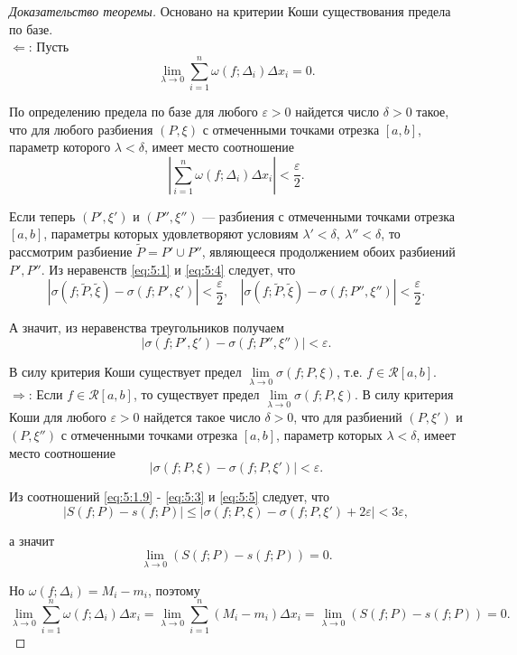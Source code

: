 \documentclass[12pt]{article}
\numberwithin{equation}{section}
\begin{document}
\begin{proof}[Доказательство теоремы] Основано на критерии Коши существования предела по базе.\\

$\Leftarrow$: Пусть
\[ \lim_{\lambda \to 0} \sum_{i=1}^n \omega(f; \Delta_i) \Delta x_i = 0.\]

По определению предела по базе для любого $\varepsilon > 0$ найдется число $\delta > 0$ такое, что для любого разбиения $(P, \xi)$ с отмеченными точками отрезка $[a,b]$, параметр которого $\lambda < \delta$, имеет место соотношение
\begin{equation}
\left| \sum_{i=1}^n \omega(f; \Delta_i) \Delta x_i\right| < \frac{\varepsilon}{2}. \label{eq:5:4}
\end{equation}

Если теперь $(P', \xi')$ и $(P'', \xi'')$  --- разбиения с отмеченными точками отрезка $[a,b]$, параметры которых удовлетворяют условиям $\lambda' < \delta,~ \lambda'' < \delta$, то рассмотрим разбиение $\tilde{P} = P' \cup P''$, являющееся продолжением обоих разбиений $P', P''$. Из неравенств \eqref{eq:5:1} и \eqref{eq:5:4} следует, что
\[ \left|\sigma(f; \tilde{P}, \tilde{\xi}) - \sigma(f; P', \xi') \right| < \frac{\varepsilon}{2}, ~~~~ \left|\sigma(f; \tilde{P}, \tilde{\xi}) - \sigma(f; P'', \xi'')\right| < \frac{\varepsilon}{2}. \]

А значит, из неравенства треугольников получаем
\[ \left| \sigma(f; P', \xi') - \sigma(f; P'', \xi'')\right| < \varepsilon.\]

В силу критерия Коши существует предел $\lim\limits_{\lambda \to 0} \sigma(f; P, \xi)$, т.е. $f \in \mathcal{R}[a,b]$.\\

$\Rightarrow$: Если  $f \in \mathcal{R}[a,b]$, то существует предел  $\lim\limits_{\lambda \to 0} \sigma(f; P, \xi)$. В силу критерия Коши для любого $\varepsilon > 0$ найдется такое число $\delta > 0$, что для разбиений $(P, \xi')$ и $(P, \xi'')$ с отмеченными точками отрезка $[a,b]$, параметр которых $\lambda < \delta$, имеет место соотношение
\begin{equation}
\left| \sigma(f;P, \xi) - \sigma(f;P, \xi')\right| < \varepsilon. \label{eq:5:5}
\end{equation}


Из соотношений \eqref{eq:5:1.9} - \eqref{eq:5:3} и \eqref{eq:5:5} следует, что
\[ \left| S(f;P) - s(f;P)\right| \leqslant | \sigma(f;P, \xi) - \sigma(f; P, \xi') + 2 \varepsilon | < 3 \varepsilon,\]

а значит
\[ \lim_{\lambda \to 0} \left( S(f;P) - s(f;P)\right) = 0.\]

Но $\omega(f;\Delta_i) = M_i - m_i$, поэтому
\[ \lim_{\lambda \to 0} \sum_{i = 1}^n \omega(f; \Delta_i) \Delta x_i =  \lim_{\lambda \to 0} \sum_{i = 1}^n (M_i - m_i) \Delta x_i =\lim_{\lambda \to 0} \left( S(f;P) - s(f;P)\right) = 0.\]
\end{proof}
\end{document}
